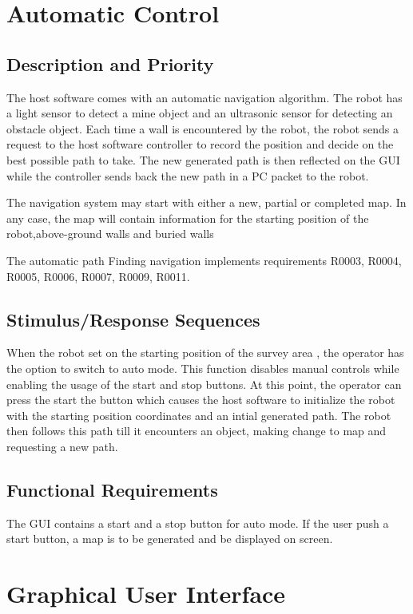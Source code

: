 
\section {Automatic Control}
\subsection {Description and Priority}
The host software comes with an automatic navigation algorithm. The robot has a light sensor to detect a mine
object and an ultrasonic sensor for detecting an obstacle object. Each time a wall is encountered by
the robot, the robot sends a request to the host software controller to record the position and decide on the best possible path to take. 
The new generated path is then reflected on the GUI while the controller sends back the new path in a PC packet to the robot.

The navigation system may start with either a new, partial or completed map. In any case, the map
will contain information for the starting position of the robot,above-ground walls and buried walls

The automatic path Finding navigation implements requirements  R0003, R0004, R0005, R0006,
R0007, R0009, R0011.
\subsection {Stimulus/Response Sequences}

When the robot set on the starting position of the survey area , the operator has the option to switch to auto
mode. This function disables manual controls while enabling the usage of the start and stop buttons.
At this point, the operator can press the start the button which causes the host software to initialize the
robot with the starting position coordinates and an intial generated path. The robot then follows this
path till it encounters an object, making change to map and requesting a new path.

\subsection {Functional Requirements}

The GUI contains a start and a stop button for auto mode. If the user push a start button, a map is to be generated and be displayed on screen.


\section{Graphical User Interface}
